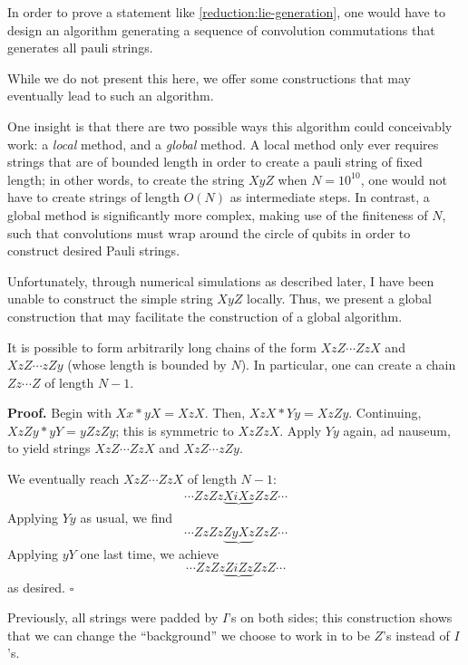 \documentclass[fleqn,12pt]{article}
\newenvironment*{proof}{\begin{trivlist}\item[]{\bf Proof.}}{\hfill$\square$\end{trivlist}}
\begin{document}
In order to prove a statement like \ref{reduction:lie-generation},
one would have to design an algorithm generating a sequence of convolution
commutations that generates all pauli strings.

While we do not present this here, we offer
some constructions that may eventually
lead to such an algorithm.

One insight is that there are two possible ways this algorithm could conceivably
work: a \emph{local} method, and a \emph{global} method. A local method only
ever requires strings that are of bounded length in order to create a pauli string of fixed length;
in other words, to create the string $XyZ$ when $N = 10^10$, one would not
have to create strings of length $O(N)$
as intermediate steps. In contrast, a global method is significantly more complex,
making use of the finiteness of $N$, such that convolutions must wrap around the
circle of qubits in order to construct desired Pauli strings.

Unfortunately, through numerical simulations as described later, I have been unable
to construct the simple string $XyZ$ locally. Thus, we present a global construction
that may facilitate the construction of a global algorithm.

\begin{thm}
    [Chains]
    It is possible to form arbitrarily long chains of the form $XzZ\cdots ZzX$
    and $XzZ\cdots zZy$ (whose length is bounded by $N$).
    In particular, one can create a chain $Zz\cdots Z$ of length $N - 1$.
\end{thm}
\begin{proof}
    Begin with $Xx * yX = XzX$. Then, $XzX * Yy = XzZy$.
    Continuing, $XzZy * yY = yZzZy$; this is symmetric to $XzZzX$.
    Apply $Yy$ again, ad nauseum, to yield strings $XzZ\cdots ZzX$
    and $XzZ\cdots zZy$.

    We eventually reach $XzZ\cdots ZzX$ of length $N - 1$:
    \begin{align*}
        \cdots ZzZz\underbrace{XiXz}ZzZ\cdots
    \end{align*}
    Applying $Yy$ as usual, we find
    \[
        \cdots ZzZz\underbrace{ZyXz}ZzZ\cdots
    \]
    Applying $yY$ one last time, we achieve
    \[
        \cdots ZzZz\underbrace{ZiZz}ZzZ\cdots
    \]
    as desired.
\end{proof}

Previously, all strings were padded by $I$'s on both sides;
this construction shows that we can change the ``background''
we choose to work in to be $Z$'s instead of $I$'s.
\end{document}
